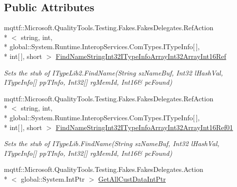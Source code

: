 \subsection*{Public Attributes}
\begin{DoxyCompactItemize}
\item 
mqttf\-::\-Microsoft.\-Quality\-Tools.\-Testing.\-Fakes.\-Fakes\-Delegates.\-Ref\-Action\\*
$<$ string, int, \\*
global\-::\-System.\-Runtime.\-Interop\-Services.\-Com\-Types.\-I\-Type\-Info\mbox{[}$\,$\mbox{]}, \\*
int\mbox{[}$\,$\mbox{]}, short $>$ \hyperlink{class_system_1_1_runtime_1_1_interop_services_1_1_com_types_1_1_fakes_1_1_stub_i_type_lib2_ae27d40f00a6af2b5b06d48bfc306adaf}{Find\-Name\-String\-Int32\-I\-Type\-Info\-Array\-Int32\-Array\-Int16\-Ref}
\begin{DoxyCompactList}\small\item\em Sets the stub of I\-Type\-Lib2.\-Find\-Name(String sz\-Name\-Buf, Int32 l\-Hash\-Val, I\-Type\-Info\mbox{[}\mbox{]} pp\-T\-Info, Int32\mbox{[}\mbox{]} rg\-Mem\-Id, Int16\& pc\-Found)\end{DoxyCompactList}\item 
mqttf\-::\-Microsoft.\-Quality\-Tools.\-Testing.\-Fakes.\-Fakes\-Delegates.\-Ref\-Action\\*
$<$ string, int, \\*
global\-::\-System.\-Runtime.\-Interop\-Services.\-Com\-Types.\-I\-Type\-Info\mbox{[}$\,$\mbox{]}, \\*
int\mbox{[}$\,$\mbox{]}, short $>$ \hyperlink{class_system_1_1_runtime_1_1_interop_services_1_1_com_types_1_1_fakes_1_1_stub_i_type_lib2_ac8bc0ab4fea0103c16911c0d74f75085}{Find\-Name\-String\-Int32\-I\-Type\-Info\-Array\-Int32\-Array\-Int16\-Ref01}
\begin{DoxyCompactList}\small\item\em Sets the stub of I\-Type\-Lib.\-Find\-Name(String sz\-Name\-Buf, Int32 l\-Hash\-Val, I\-Type\-Info\mbox{[}\mbox{]} pp\-T\-Info, Int32\mbox{[}\mbox{]} rg\-Mem\-Id, Int16\& pc\-Found)\end{DoxyCompactList}\item 
mqttf\-::\-Microsoft.\-Quality\-Tools.\-Testing.\-Fakes.\-Fakes\-Delegates.\-Action\\*
$<$ global\-::\-System.\-Int\-Ptr $>$ \hyperlink{class_system_1_1_runtime_1_1_interop_services_1_1_com_types_1_1_fakes_1_1_stub_i_type_lib2_aa94a84cd2761058892521b6670909eb8}{Get\-All\-Cust\-Data\-Int\-Ptr}

\end{DoxyCompactItemize}
